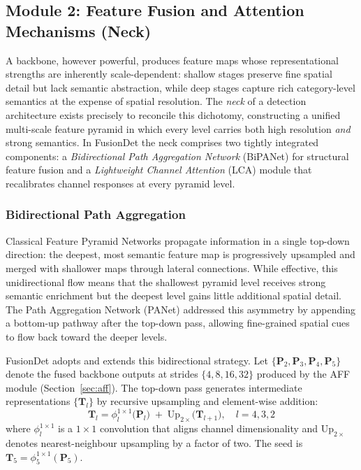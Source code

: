 
\subsection{Module 2: Feature Fusion and Attention Mechanisms
(Neck)}

A backbone, however powerful, produces feature maps whose
representational strengths are inherently scale-dependent:
shallow stages preserve fine spatial detail but lack semantic
abstraction, while deep stages capture rich category-level
semantics at the expense of spatial resolution. The
\textit{neck} of a detection architecture exists precisely to
reconcile this dichotomy, constructing a unified multi-scale
feature pyramid in which every level carries both high
resolution \textit{and} strong semantics. In FusionDet the neck
comprises two tightly integrated components: a \textit{Bidirectional
Path Aggregation Network} (BiPANet) for structural feature
fusion and a \textit{Lightweight Channel Attention} (LCA)
module that recalibrates channel responses at every pyramid
level.

\subsubsection{Bidirectional Path Aggregation}

Classical Feature Pyramid Networks \cite{lin2017feature}
propagate information in a single top-down direction: the
deepest, most semantic feature map is progressively upsampled
and merged with shallower maps through lateral connections.
While effective, this unidirectional flow means that the
shallowest pyramid level receives strong semantic enrichment
but the deepest level gains little additional spatial detail.
The Path Aggregation Network (PANet) \cite{liu2018path}
addressed this asymmetry by appending a bottom-up pathway after
the top-down pass, allowing fine-grained spatial cues to flow
back toward the deeper levels.

FusionDet adopts and extends this bidirectional strategy. Let
$\{\mathbf{P}_{2},\mathbf{P}_{3},\mathbf{P}_{4},
\mathbf{P}_{5}\}$ denote the fused backbone outputs at strides
$\{4,8,16,32\}$ produced by the AFF module
(Section~\ref{sec:aff}). The top-down pass generates intermediate
representations $\{\mathbf{T}_{l}\}$ by recursive upsampling
and element-wise addition:
\begin{equation}
    \mathbf{T}_{l} =
    \phi^{1\times1}_{l}\!\bigl(\mathbf{P}_{l}\bigr)
    \;+\;
    \text{Up}_{2\times}\!\bigl(\mathbf{T}_{l+1}\bigr),
    \quad l = 4,3,2
    \label{eq:topdown}
\end{equation}
where $\phi^{1\times1}_{l}$ is a $1\times1$ convolution that
aligns channel dimensionality and $\text{Up}_{2\times}$ denotes
nearest-neighbour upsampling by a factor of two. The seed is
$\mathbf{T}_{5} = \phi^{1\times1}_{5}(\mathbf{P}_{5})$.

